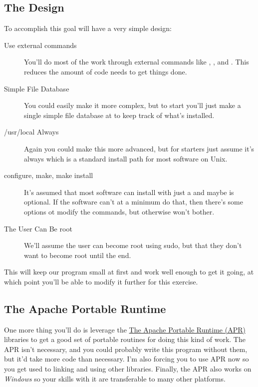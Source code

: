 \subsection{The Design}

To accomplish this goal  will have a very simple design:

\begin{description}
\item[Use external commands] You'll do most of the work through external
    commands like , , and .  This
    reduces the amount of code  needs to get things done.
\item[Simple File Database] You could easily make it more complex, but to
    start you'll just make a single simple file database at
     to keep track of what's installed.
\item[/usr/local Always] Again you could make this more advanced, but for
    starters just assume it's always  which is a standard
    install path for most software on Unix.
\item[configure, make, make install] It's assumed that most software can
    install with just a  and maybe
     is optional.  If the software can't at a minimum
    do that, then there's some options ot modify the commands, but otherwise
     won't bother.
\item[The User Can Be root] We'll assume the user can become root using
    sudo, but that they don't want to become root until the end.
\end{description}

This will keep our program small at first and work well enough to get it
going, at which point you'll be able to modify it further for this exercise.


\subsection{The Apache Portable Runtime}

One more thing you'll do is leverage the \href{http://apr.apache.org/}{The
Apache Portable Runtime (APR)} libraries to get a good set of portable routines
for doing this kind of work.  The APR isn't necessary, and you could probably
write this program without them, but it'd take more code than necessary.
I'm also forcing you to use APR now so you get used to linking and using
other libraries.  Finally, the APR also works on \emph{Windows} so your
skills with it are transferable to many other platforms.

